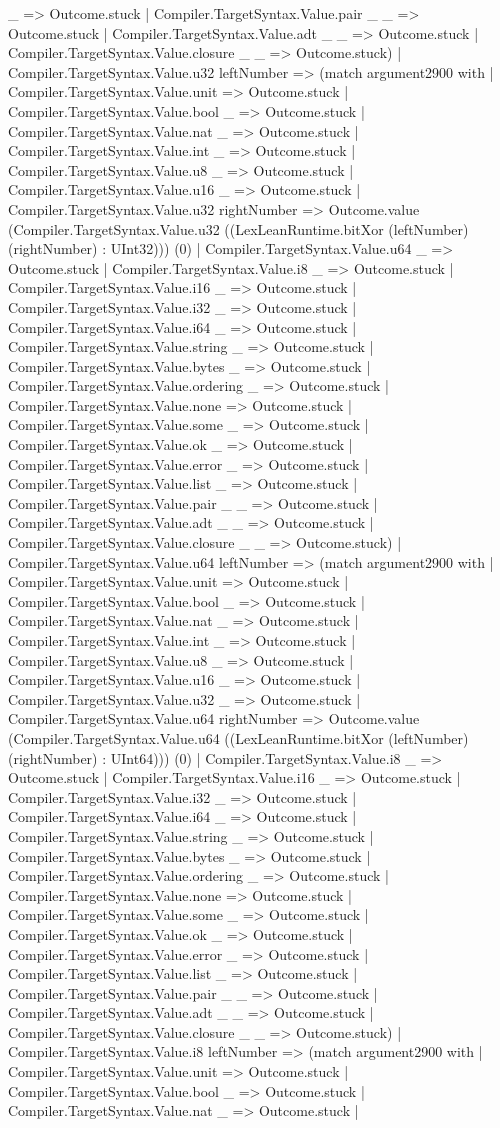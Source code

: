 \documentclass[11pt]{article}
\begin{document}
\_ => Outcome.stuck | Compiler.TargetSyntax.Value.pair \_ \_ => Outcome.stuck | Compiler.TargetSyntax.Value.adt \_ \_ => Outcome.stuck | Compiler.TargetSyntax.Value.closure \_ \_ => Outcome.stuck) | Compiler.TargetSyntax.Value.u32 leftNumber => (match argument2900 with | Compiler.TargetSyntax.Value.unit => Outcome.stuck | Compiler.TargetSyntax.Value.bool \_ => Outcome.stuck | Compiler.TargetSyntax.Value.nat \_ => Outcome.stuck | Compiler.TargetSyntax.Value.int \_ => Outcome.stuck | Compiler.TargetSyntax.Value.u8 \_ => Outcome.stuck | Compiler.TargetSyntax.Value.u16 \_ => Outcome.stuck | Compiler.TargetSyntax.Value.u32 rightNumber => Outcome.value (Compiler.TargetSyntax.Value.u32 ((LexLeanRuntime.bitXor (leftNumber) (rightNumber) : UInt32))) (0) | Compiler.TargetSyntax.Value.u64 \_ => Outcome.stuck | Compiler.TargetSyntax.Value.i8 \_ => Outcome.stuck | Compiler.TargetSyntax.Value.i16 \_ => Outcome.stuck | Compiler.TargetSyntax.Value.i32 \_ => Outcome.stuck | Compiler.TargetSyntax.Value.i64 \_ => Outcome.stuck | Compiler.TargetSyntax.Value.string \_ => Outcome.stuck | Compiler.TargetSyntax.Value.bytes \_ => Outcome.stuck | Compiler.TargetSyntax.Value.ordering \_ => Outcome.stuck | Compiler.TargetSyntax.Value.none => Outcome.stuck | Compiler.TargetSyntax.Value.some \_ => Outcome.stuck | Compiler.TargetSyntax.Value.ok \_ => Outcome.stuck | Compiler.TargetSyntax.Value.error \_ => Outcome.stuck | Compiler.TargetSyntax.Value.list \_ => Outcome.stuck | Compiler.TargetSyntax.Value.pair \_ \_ => Outcome.stuck | Compiler.TargetSyntax.Value.adt \_ \_ => Outcome.stuck | Compiler.TargetSyntax.Value.closure \_ \_ => Outcome.stuck) | Compiler.TargetSyntax.Value.u64 leftNumber => (match argument2900 with | Compiler.TargetSyntax.Value.unit => Outcome.stuck | Compiler.TargetSyntax.Value.bool \_ => Outcome.stuck | Compiler.TargetSyntax.Value.nat \_ => Outcome.stuck | Compiler.TargetSyntax.Value.int \_ => Outcome.stuck | Compiler.TargetSyntax.Value.u8 \_ => Outcome.stuck | Compiler.TargetSyntax.Value.u16 \_ => Outcome.stuck | Compiler.TargetSyntax.Value.u32 \_ => Outcome.stuck | Compiler.TargetSyntax.Value.u64 rightNumber => Outcome.value (Compiler.TargetSyntax.Value.u64 ((LexLeanRuntime.bitXor (leftNumber) (rightNumber) : UInt64))) (0) | Compiler.TargetSyntax.Value.i8 \_ => Outcome.stuck | Compiler.TargetSyntax.Value.i16 \_ => Outcome.stuck | Compiler.TargetSyntax.Value.i32 \_ => Outcome.stuck | Compiler.TargetSyntax.Value.i64 \_ => Outcome.stuck | Compiler.TargetSyntax.Value.string \_ => Outcome.stuck | Compiler.TargetSyntax.Value.bytes \_ => Outcome.stuck | Compiler.TargetSyntax.Value.ordering \_ => Outcome.stuck | Compiler.TargetSyntax.Value.none => Outcome.stuck | Compiler.TargetSyntax.Value.some \_ => Outcome.stuck | Compiler.TargetSyntax.Value.ok \_ => Outcome.stuck | Compiler.TargetSyntax.Value.error \_ => Outcome.stuck | Compiler.TargetSyntax.Value.list \_ => Outcome.stuck | Compiler.TargetSyntax.Value.pair \_ \_ => Outcome.stuck | Compiler.TargetSyntax.Value.adt \_ \_ => Outcome.stuck | Compiler.TargetSyntax.Value.closure \_ \_ => Outcome.stuck) | Compiler.TargetSyntax.Value.i8 leftNumber => (match argument2900 with | Compiler.TargetSyntax.Value.unit => Outcome.stuck | Compiler.TargetSyntax.Value.bool \_ => Outcome.stuck | Compiler.TargetSyntax.Value.nat \_ => Outcome.stuck | 
\end{document}
